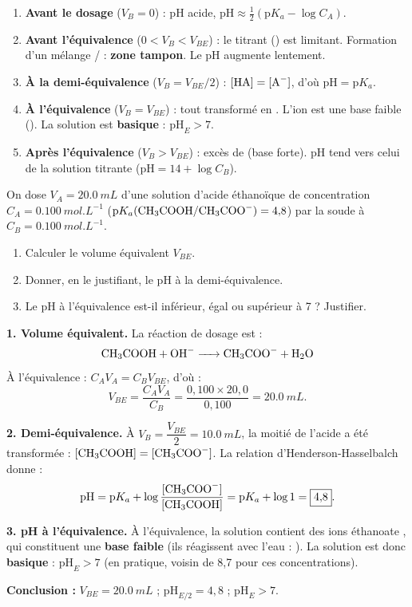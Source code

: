 \documentclass[11pt]{article}
\begin{document}
\begin{methode}[Décrire et justifier l'allure de la courbe $\mathrm{pH} = f(V_B)$ pour acide faible / base forte]
\begin{enumerate}
\item \textbf{Avant le dosage} ($V_B = 0$) : pH acide, $\mathrm{pH} \approx \tfrac{1}{2}(\mathrm{p}K_a - \log C_A)$.
\item \textbf{Avant l'équivalence} ($0 < V_B < V_{BE}$) : le titrant () est limitant. Formation d'un mélange / : \textbf{zone tampon}. Le pH augmente lentement.
\item \textbf{À la demi-équivalence} ($V_B = V_{BE}/2$) : $[\ce{HA}] = [\ce{A-}]$, d'où $\boxed{\mathrm{pH} = \mathrm{p}K_a}$.
\item \textbf{À l'équivalence} ($V_B = V_{BE}$) : tout  transformé en . L'ion  est une base faible (). La solution est \textbf{basique} : $\mathrm{pH}_E > 7$.
\item \textbf{Après l'équivalence} ($V_B > V_{BE}$) : excès de  (base forte). pH tend vers celui de la solution titrante ($\mathrm{pH} = 14 + \log C_B$).
\end{enumerate}
\end{methode}

\begin{exoresolu}
On dose $V_A = \SI{20,0}{mL}$ d'une solution d'acide éthanoïque de concentration $C_A = \SI{0,100}{mol.L^{-1}}$ ($\mathrm{p}K_a(\ce{CH3COOH}/\ce{CH3COO-}) = 4{,}8$) par la soude à $C_B = \SI{0,100}{mol.L^{-1}}$.
\begin{enumerate}
\item Calculer le volume équivalent $V_{BE}$.
\item Donner, en le justifiant, le pH à la demi-équivalence.
\item Le pH à l'équivalence est-il inférieur, égal ou supérieur à 7 ? Justifier.
\end{enumerate}
\tcblower
\textbf{1. Volume équivalent.} La réaction de dosage est :
\[ \ce{CH3COOH + OH- -> CH3COO- + H2O} \]
À l'équivalence : $C_A V_A = C_B V_{BE}$, d'où :
\[ V_{BE} = \frac{C_A V_A}{C_B} = \frac{0{,}100 \times 20{,}0}{0{,}100} = \SI{20,0}{mL}. \]

\textbf{2. Demi-équivalence.} À $V_B = \dfrac{V_{BE}}{2} = \SI{10,0}{mL}$, la moitié de l'acide a été transformée : $[\ce{CH3COOH}] = [\ce{CH3COO-}]$. La relation d'Henderson-Hasselbalch donne :
\[ \mathrm{pH} = \mathrm{p}K_a + \log\frac{[\ce{CH3COO-}]}{[\ce{CH3COOH}]} = \mathrm{p}K_a + \log 1 = \boxed{4{,}8}. \]

\textbf{3. pH à l'équivalence.} À l'équivalence, la solution contient des ions éthanoate , qui constituent une \textbf{base faible} (ils réagissent avec l'eau : ). La solution est donc \textbf{basique} : $\mathrm{pH}_E > 7$ (en pratique, voisin de 8,7 pour ces concentrations).

\textbf{Conclusion :} $V_{BE} = \SI{20,0}{mL}$ ; $\mathrm{pH}_{E/2} = 4{,}8$ ; $\mathrm{pH}_E > 7$.
\end{exoresolu}
\end{document}
